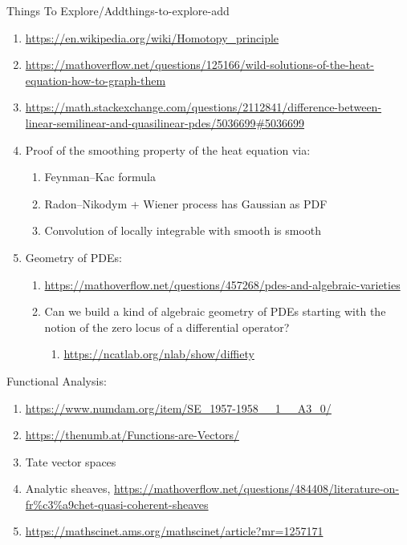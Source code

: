 \begin{remark}{Things To Explore/Add}{things-to-explore-add}
\begin{enumerate}
\begin{enumerate}
                \item \url{https://arxiv.org/abs/2507.07937}
            \end{enumerate}
        \item \url{https://en.wikipedia.org/wiki/Homotopy_principle}
        \item \url{https://mathoverflow.net/questions/125166/wild-solutions-of-the-heat-equation-how-to-graph-them}
        \item \url{https://math.stackexchange.com/questions/2112841/difference-between-linear-semilinear-and-quasilinear-pdes/5036699\#5036699}
        \item Proof of the smoothing property of the heat equation via:
            \begin{enumerate}
                \item Feynman--Kac formula
                \item Radon--Nikodym + Wiener process has Gaussian as PDF
                \item Convolution of locally integrable with smooth is smooth
            \end{enumerate}
        \item Geometry of PDEs:
            \begin{enumerate}
                \item \url{https://mathoverflow.net/questions/457268/pdes-and-algebraic-varieties}
                \item Can we build a kind of algebraic geometry of PDEs starting with the notion of the zero locus of a differential operator?
                    \begin{enumerate}
                        \item \url{https://ncatlab.org/nlab/show/diffiety}
                    \end{enumerate}
            \end{enumerate}
    \end{enumerate}
    Functional Analysis:
    \begin{enumerate}
        \item \url{https://www.numdam.org/item/SE_1957-1958__1__A3_0/}
        \item \url{https://thenumb.at/Functions-are-Vectors/}
        \item Tate vector spaces
        \item Analytic sheaves, \url{https://mathoverflow.net/questions/484408/literature-on-fr\%c3\%a9chet-quasi-coherent-sheaves}
        \item \url{https://mathscinet.ams.org/mathscinet/article?mr=1257171}

\end{enumerate}
\end{remark}
